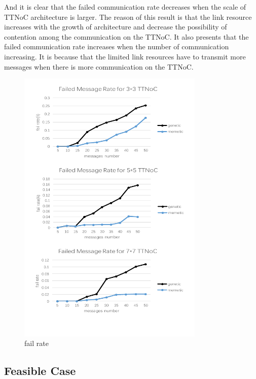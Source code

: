\documentclass[conference]{IEEEtran}
\begin{document}
And it is clear that the failed communication rate decreases when the scale of TTNoC architecture is larger. The reason of this result is that the link resource increases with the growth of architecture and decrease the possibility of contention among the communication on the TTNoC. It also presents that the failed communication rate increases when the number of communication increasing. It is because that the limited link resources have to transmit more messages when there is more communication on the TTNoC.
\begin{figure}[!t]
	\centering
	\includegraphics[width=3.5in]{picture/rate}
	\caption{fail rate}
	\label{fail rate}
\end{figure}

\subsection{Feasible Case}
\end{document}
